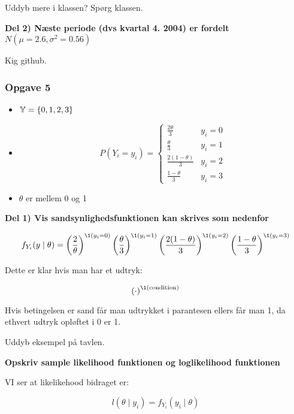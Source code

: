 Uddyb mere i klassen? Spørg klassen.

\textbf{Del 2) Næste periode (dvs kvartal 4. 2004) er fordelt $N(\mu = 2.6, \sigma^2 = 0.56)$}

Kig github.
\subsubsection{Opgave 5}

\begin{itemize}
    \item $\mathbb{Y} = \{0, 1, 2, 3\}$
    \item
    \begin{equation}
    P(Y_i = y_i) = \begin{cases}
        \frac{2\theta}{3} & y_i=0\\
        \frac{\theta}{3} & y_i=1 \\
        \frac{2(1-\theta)}{3} & y_i=2 \\
        \frac{1- \theta}{3} & y_i= 3
    \end{cases}
    \end{equation}
    \item $\theta$ er mellem 0 og 1
\end{itemize}

\textbf{Del 1) Vis sandsynlighedsfunktionen kan skrives som nedenfor}

\begin{equation}
    f_{Y_i}(y \mid \theta) = \lp \frac{2}{\theta}\rp^{\1(y_i = 0)} \lp \frac{\theta}{3} \rp^{\1(y_i = 1)} \lp \frac{2(1-\theta)}{3} \rp^{\1(y_i = 2)} \lp  \frac{1- \theta}{3} \rp^{\1(y_i = 3)}
\end{equation}

Dette er klar hvis man har et udtryk:

\begin{equation}
    \lp \cdot \rp^{\1(\text{condition})}
\end{equation}

Hvis betingelsen er sand får man udtrykket i parantesen ellers får man 1, da ethvert udtryk opløftet i 0 er 1.

Uddyb eksempel på tavlen.

\textbf{Opskriv sample likelihood funktionen og loglikelihood funktionen}

VI ser at likelikehood bidraget er:

\begin{equation}
    l(\theta \mid y_i) = f_{Y_i}(y_i \mid \theta)
\end{equation}

